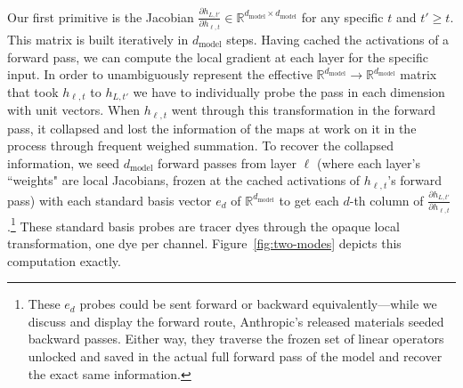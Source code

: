 \documentclass{article}
\newcommand{\dmodel}{d_{\text{model}}}
\begin{document}
Our first primitive is the Jacobian \(\frac{\partial h_{L,t'}}{\partial h_{\ell,t}} \in \mathbb{R}^{\dmodel \times \dmodel}\) for any specific \(t\) and \(t' \ge t\). This matrix is built iteratively in \(\dmodel\) steps. Having cached the activations of a forward pass, we can compute the local gradient at each layer for the specific input. In order to unambiguously represent the effective \(\mathbb{R}^{\dmodel} \to \mathbb{R}^{\dmodel}\) matrix that took \(h_{\ell,t}\) to \(h_{L,t'}\) we have to individually probe the pass in each dimension with unit vectors. When \(h_{\ell,t}\) went through this transformation in the forward pass, it collapsed and lost the information of the maps at work on it in the process through frequent weighed summation. To recover the collapsed information, we seed \(\dmodel\) forward passes from layer \(\ell\) (where each layer's ``weights" are local Jacobians, frozen at the cached activations of \(h_{\ell,t}\)'s forward pass) with each standard basis vector \(e_d\) of \(\mathbb{R}^{\dmodel}\) to get each \(d\)-th column of \(\frac{\partial h_{L,t'}}{\partial h_{\ell,t}}\).\footnote{These \(e_d\) probes could be sent forward or backward equivalently---while we discuss and display the forward route, Anthropic's released materials seeded backward passes. Either way, they traverse the frozen set of linear operators unlocked and saved in the actual full forward pass of the model and recover the exact same information.} These standard basis probes are tracer dyes through the opaque local transformation, one dye per channel. Figure~\ref{fig:two-modes} depicts this computation exactly.   
\end{document}
